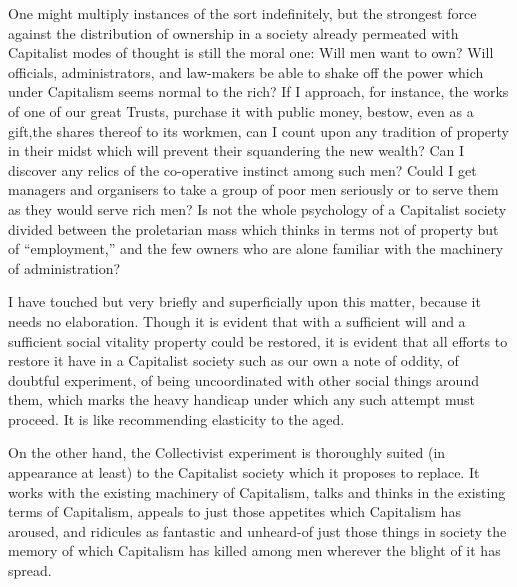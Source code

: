 \documentclass{book}
\begin{document}
One might multiply instances of the sort indefinitely, but the strongest force against the distribution of ownership in a society already permeated with Capitalist modes of thought is still the moral one: Will men want to own? Will officials, administrators, and law-makers be able to shake off the power which under Capitalism seems normal to the rich? If I approach, for instance, the works of one of our great Trusts, purchase it with public money, bestow, even as a gift,the shares thereof to its workmen, can I count upon any tradition of property in their midst which will prevent their squandering the new wealth? Can I discover any relics of the co-operative instinct among such men? Could I get managers and organisers to take a group of poor men seriously or to serve them as they would serve rich men? Is not the whole psychology of a Capitalist society divided between the proletarian mass which thinks in terms not of property but of “employment,” and the few owners who are alone familiar with the machinery of administration?

I have touched but very briefly and superficially upon this matter, because it needs no elaboration. Though it is evident that with a sufficient will and a sufficient social vitality property could be restored, it is evident that all efforts to restore it have in a Capitalist society such as our own a note of oddity, of doubtful experiment, of being uncoordinated with other social things around them, which marks the heavy handicap under which any such attempt must proceed. It is like recommending elasticity to the aged.

On the other hand, the Collectivist experiment is thoroughly suited (in appearance at least) to the Capitalist society which it proposes to replace. It works with the existing machinery of Capitalism, talks and thinks in the existing terms of Capitalism, appeals to just those appetites which Capitalism has aroused, and ridicules as fantastic and unheard-of just those things in society the memory of which Capitalism has killed among men wherever the blight of it has spread.
\end{document}
